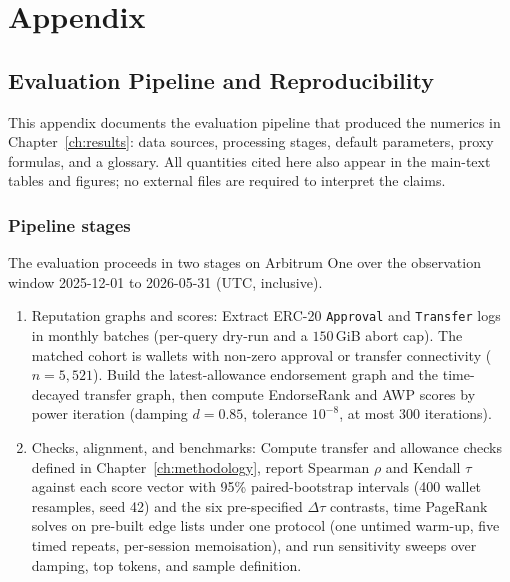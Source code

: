 \clearpage
\chapter{Appendix}
\label{ch:appendix}

\renewcommand{\dissertationSubheading}[2][]{%
  \phantomsection
  \subsection{#2}%
  \if\relax\detokenize{#1}\relax\else\label{#1}\fi
}
\renewcommand{\dissertationSubsubheading}[2][]{%
  \phantomsection
  \subsubsection{#2}%
  \if\relax\detokenize{#1}\relax\else\label{#1}\fi
}

\section{Evaluation Pipeline and Reproducibility}
\label{ch:appendix-eval}

This appendix documents the evaluation pipeline that produced the numerics in Chapter~\ref{ch:results}: data sources, processing stages, default parameters, proxy formulas, and a glossary. All quantities cited here also appear in the main-text tables and figures; no external files are required to interpret the claims.

\dissertationSubheading[sec:pipeline-stages]{Pipeline stages}

The evaluation proceeds in two stages on Arbitrum One over the observation window 2025-12-01 to 2026-05-31 (UTC, inclusive).

\begin{enumerate}
\item Reputation graphs and scores: Extract ERC-20 \texttt{Approval} and \texttt{Transfer} logs in monthly batches (per-query dry-run and a $150$\,GiB abort cap). The matched cohort is wallets with non-zero approval or transfer connectivity ($n=5{,}521$). Build the latest-allowance endorsement graph and the time-decayed transfer graph, then compute EndorseRank and AWP scores by power iteration (damping $d=0.85$, tolerance $10^{-8}$, at most $300$ iterations).
\item Checks, alignment, and benchmarks: Compute transfer and allowance checks defined in Chapter~\ref{ch:methodology}, report Spearman $\rho$ and Kendall $\tau$ against each score vector with 95\% paired-bootstrap intervals (400 wallet resamples, seed 42) and the six pre-specified $\Delta\tau$ contrasts, time PageRank solves on pre-built edge lists under one protocol (one untimed warm-up, five timed repeats, per-session memoisation), and run sensitivity sweeps over damping, top tokens, and sample definition.
\end{enumerate}

